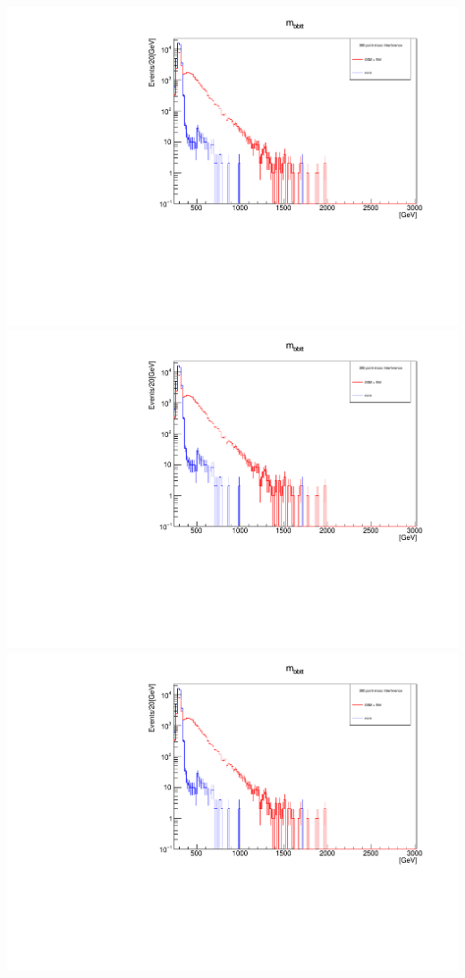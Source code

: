 \documentclass[a4wide,10pt]{article}
\begin{document}
\includegraphics[scale=0.50,page=1]{InterferencePlots01p.pdf}
\includegraphics[scale=0.50,page=2]{InterferencePlots01p.pdf}
\includegraphics[scale=0.50,page=3]{InterferencePlots01p.pdf}
\end{document}
